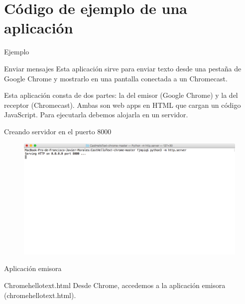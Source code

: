 \section{Código de ejemplo de una aplicación}

\begin{frame}{Ejemplo}
	\begin{block}{Enviar mensajes}
		Esta aplicación sirve para enviar texto desde una pestaña de Google Chrome y mostrarlo en una pantalla conectada a un Chromecast.
	\end{block}
	
	\begin{block}{ }
		Esta aplicación consta de dos partes: la del emisor (Google Chrome) y la del receptor (Chromecast).
		Ambas son web apps en HTML que cargan un código JavaScript.
		Para ejecutarla debemos alojarla en un servidor.
	\end{block}
\end{frame}



\begin{frame}{Creando servidor en el puerto 8000}
	\begin{figure}[H]
		\centering
		\includegraphics[width=1.05\textwidth]{./Imagenes/creando_servidor.png}
	\end{figure}
\end{frame}



\begin{frame}{Aplicación emisora}
	\begin{block}{Chromehellotext.html}
		Desde Chrome, accedemos a la aplicación emisora (chromehellotext.html).
	\end{block}
\end{frame}



